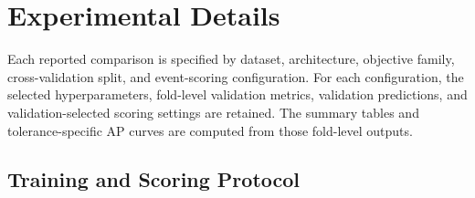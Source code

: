\section{Experimental Details}
\label{app:experimental-details}

Each reported comparison is specified by dataset, architecture, objective family, cross-validation split, and event-scoring configuration.
For each configuration, the selected hyperparameters, fold-level validation metrics, validation predictions, and validation-selected scoring settings are retained.
The summary tables and tolerance-specific AP curves are computed from those fold-level outputs.

\subsection{Training and Scoring Protocol}


